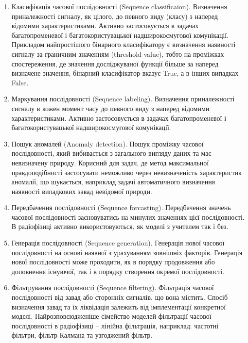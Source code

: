\begin{enumerate}

	\item Класифікація часової послідовності (Sequence classificaion). 
	Визначення приналежності сигналу, як цілого, до певного виду (класу) 
	з наперед відомими характеристиками. Активно застосовується в задачах 
	багатопроменевої і багатокористувацької надширокосмугової комунікації. 
	Прикладом найпростішого бінарного класифікатору є визначення наявності 
	сигналу за граничним значенням (threshold value), тобто на проміжках 
	спостереження, де значення досліджуваної функції більше за наперед 
	визначене значення, бінарний класифікатор вказує True, а в інших 
	випадках False.

	\item Маркування послідовності (Sequence labeling). Визначення 
	приналежності сигналу в кожен момент часу до певного виду з наперед 
	відомими характеристиками. Активно застосовується в задачах 
	багатопроменевої і багатокористувацької надширокосмугової комунікації.

	\item Пошук аномалей (Anomaly detection). Пошук проміжку часової 
	послідовності, який вибивається з загального вигляду даних та має 
	невизначену природу. Корисний для задач, де метод максимальної 
	правдоподібності застосувати неможливо через невизначеність 
	характеристик аномалії, що шукається, наприклад задачі автоматичного 
	визначення наявності випадкових завад невідомої природи.

	\item Передбачення послідовності (Sequence forcasting). Передбачення 
	значень часової послідовності засновуватись на минулих значеннях цієї 
	послідовності. В радіофізиці активно використовуються, як моделі з 
	учителем так і без.

	\item Генерація послідовності (Sequence generation). Генерація нової 
	часової послідовності на основі наявної з урахуванням зовнішніх факторів. 
	Генерація нової послідовності може проходити, як в порядку продовження 
	або доповнення існуючої, так і в порядку створення окремої послідовності.

	\item Фільтрування послідовності (Sequence filtering). Фільтрація 
	часової послідовності від завад або сторонніх сигналів, що вона 
	містить. Спосіб визначення завад та їх ліквідація залежить від 
	імплементації конкретної моделі. Найрозповсюдженіше сімейство моделей
	фільтрації часової послідовності в радіофізиці -- лінійна фільтрація, 
	наприклад: частотні фільтри, фільтр Калмана та узгоджений фільтр.

\end{enumerate}

